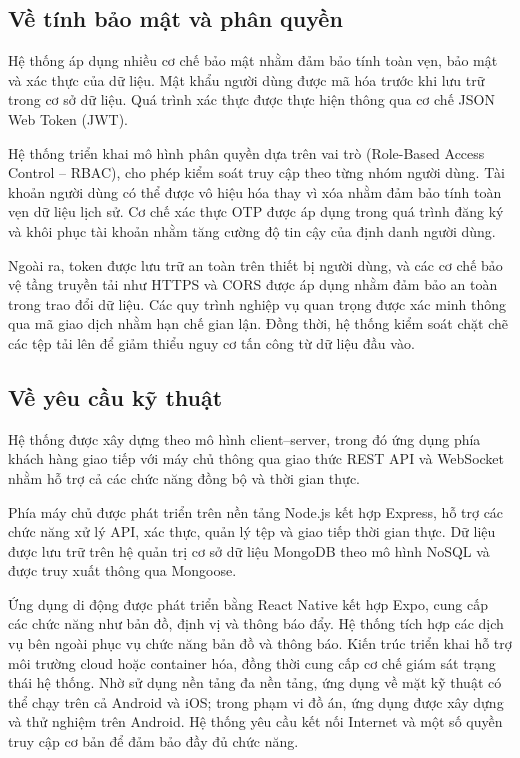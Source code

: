\documentclass[../main.tex]{subfiles}%
\begin{document}
\subsection{Về tính bảo mật và phân quyền}
\label{section:2.5.5}

Hệ thống áp dụng nhiều cơ chế bảo mật nhằm đảm bảo tính toàn vẹn, bảo mật và xác thực của dữ liệu. Mật khẩu người dùng được mã hóa trước khi lưu trữ trong cơ sở dữ liệu. Quá trình xác thực được thực hiện thông qua cơ chế JSON Web Token (JWT).

Hệ thống triển khai mô hình phân quyền dựa trên vai trò (Role-Based Access Control – RBAC), cho phép kiểm soát truy cập theo từng nhóm người dùng. Tài khoản người dùng có thể được vô hiệu hóa thay vì xóa nhằm đảm bảo tính toàn vẹn dữ liệu lịch sử. Cơ chế xác thực OTP được áp dụng trong quá trình đăng ký và khôi phục tài khoản nhằm tăng cường độ tin cậy của định danh người dùng.

Ngoài ra, token được lưu trữ an toàn trên thiết bị người dùng, và các cơ chế bảo vệ tầng truyền tải như HTTPS và CORS được áp dụng nhằm đảm bảo an toàn trong trao đổi dữ liệu. Các quy trình nghiệp vụ quan trọng được xác minh thông qua mã giao dịch nhằm hạn chế gian lận. Đồng thời, hệ thống kiểm soát chặt chẽ các tệp tải lên để giảm thiểu nguy cơ tấn công từ dữ liệu đầu vào.

\subsection{Về yêu cầu kỹ thuật}
\label{section:2.5.6}

Hệ thống được xây dựng theo mô hình client–server, trong đó ứng dụng phía khách hàng giao tiếp với máy chủ thông qua giao thức REST API và WebSocket nhằm hỗ trợ cả các chức năng đồng bộ và thời gian thực.

Phía máy chủ được phát triển trên nền tảng Node.js kết hợp Express, hỗ trợ các chức năng xử lý API, xác thực, quản lý tệp và giao tiếp thời gian thực. Dữ liệu được lưu trữ trên hệ quản trị cơ sở dữ liệu MongoDB theo mô hình NoSQL và được truy xuất thông qua Mongoose.

Ứng dụng di động được phát triển bằng React Native kết hợp Expo, cung cấp các chức năng như bản đồ, định vị và thông báo đẩy. Hệ thống tích hợp các dịch vụ bên ngoài phục vụ chức năng bản đồ và thông báo. Kiến trúc triển khai hỗ trợ môi trường cloud hoặc container hóa, đồng thời cung cấp cơ chế giám sát trạng thái hệ thống. Nhờ sử dụng nền tảng đa nền tảng, ứng dụng về mặt kỹ thuật có thể chạy trên cả Android và iOS; trong phạm vi đồ án, ứng dụng được xây dựng và thử nghiệm trên Android. Hệ thống yêu cầu kết nối Internet và một số quyền truy cập cơ bản để đảm bảo đầy đủ chức năng.
\end{document}
